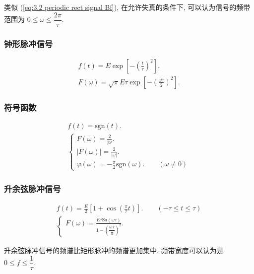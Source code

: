 类似 (\ref{eq:3.2 periodic rect signal Bf}), 在允许失真的条件下, 可以认为信号的频带范围为 $0\leq \omega\leq \dfrac{2\pi}{\tau}$.

\subsubsection{钟形脉冲信号}
\rmg
\begin{gather}
    f(t)=E\exp\left[-\left(\frac{t}{\tau}\right)^2\right]. \\
    F(\omega)=\sqrt{\pi}E\tau\exp\left[-\left(\frac{\omega\tau}{2}\right)^2\right].
\end{gather}

\subsubsection{符号函数} \label{3.4 符号函数}
\rmg\srmg
\begin{gather}
    f(t)=\mathrm{sgn}(t). \\
    \begin{cases}
        F(\omega)=\frac{2}{\mathrm{j}\omega}. \\
        |F(\omega)|=\frac{2}{|\omega|}.       \\
        \varphi(\omega)=-\frac{\pi}{2}\mathrm{sgn}(\omega).\qquad (\omega\neq 0)
    \end{cases}
\end{gather}

\subsubsection{升余弦脉冲信号}
\rmg
\begin{gather}
    f(t)=\frac{E}{2}\left[1+\cos\left(\frac{\pi}{\tau}t\right)\right].\qquad (-\tau\leq t\leq \tau) \\
    \begin{cases}
        F(\omega)=\frac{E\tau\mathrm{Sa}(\omega\tau)}{1-\left(\dfrac{\omega\tau}{\pi}\right)^2}.
    \end{cases}
\end{gather}

升余弦脉冲信号的频谱比矩形脉冲的频谱更加集中. 频带宽度可以认为是 $0\leq f\leq \dfrac{1}{\tau}$.
